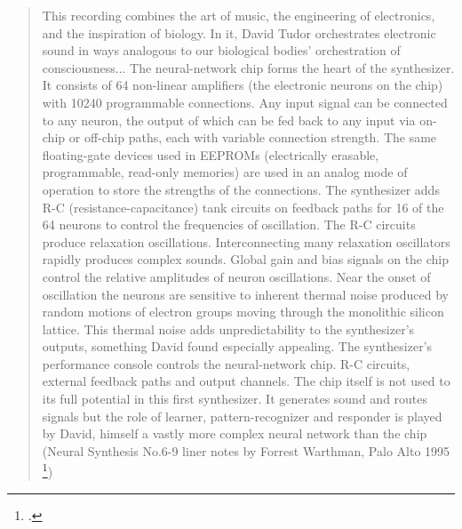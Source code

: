 \begin{quote}
This recording combines the art of music, the engineering of electronics,
and the inspiration of biology. In it,
David Tudor orchestrates electronic sound in ways analogous to
our biological bodies' orchestration of consciousness...
The neural-network chip forms the heart of the synthesizer.
It consists of 64 non-linear amplifiers (the electronic neurons on the chip)
with 10240 programmable connections.
Any input signal can be connected to any neuron,
the output of which can be fed back to any input via on-chip or off-chip paths,
each with variable connection strength. The same floating-gate devices used in EEPROMs
(electrically erasable, programmable, read-only memories)
are used in an analog mode of operation to store the strengths of the connections.
The synthesizer adds R-C (resistance-capacitance) tank circuits on feedback
paths for 16 of the 64 neurons to control the frequencies of oscillation.
The R-C circuits produce relaxation oscillations.
Interconnecting many relaxation oscillators rapidly produces complex sounds.
Global gain and bias signals on the chip control the relative amplitudes of neuron oscillations.
Near the onset of oscillation the neurons are sensitive to inherent
thermal noise produced by random motions of electron groups moving through
the monolithic silicon lattice. This thermal noise adds unpredictability
to the synthesizer’s outputs, something David found especially appealing.
The synthesizer’s performance console controls the neural-network chip.
R-C circuits, external feedback paths and output channels.
The chip itself is not used to its full potential in this first synthesizer.
It generates sound and routes signals but the role of learner,
pattern-recognizer and responder is played by David, himself a vastly
more complex neural network than the chip \\
(Neural Synthesis No.6-9 liner notes by Forrest Warthman, Palo Alto 1995
\footcite{http://www.lovely.com/albumnotes/notes1602.html})
\end{quote}

